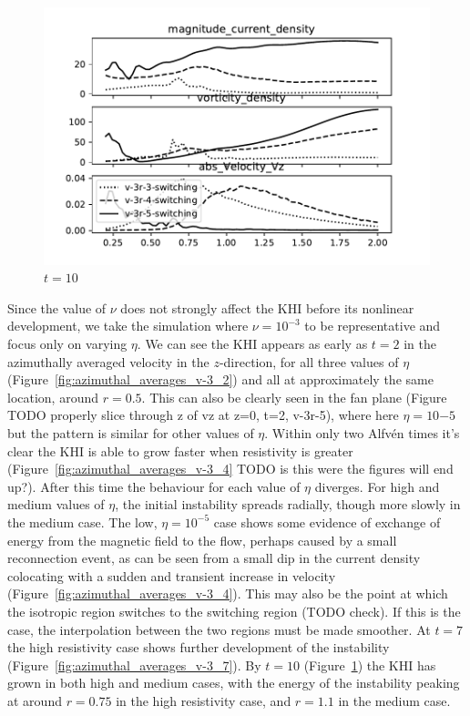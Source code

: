 \begin{figure}[h]
  \centering
  \includegraphics[width=0.8\linewidth]{./images/null_point_khi/azimuthal_averages_v-3_10.pdf}
  \caption{$t=10$}%
  \label{fig:azimuthal_averages_v-3_10}
\end{figure}

Since the value of $\nu$ does not strongly affect the KHI before its nonlinear development, we take the simulation where $\nu = 10^{-3}$ to be representative and focus only on varying $\eta$. We can see the KHI appears as early as $t=2$ in the azimuthally averaged velocity in the $z$-direction, for all three values of $\eta$ (Figure~\ref{fig:azimuthal_averages_v-3_2}) and all at approximately the same location, around $r=0.5$. This can also be clearly seen in the fan plane (Figure TODO properly slice through z of vz at z=0, t=2, v-3r-5), where here $\eta=10{-5}$ but the pattern is similar for other values of $\eta$. Within only two Alfv\'en times it's clear the KHI is able to grow faster when resistivity is greater (Figure~\ref{fig:azimuthal_averages_v-3_4} TODO is this were the figures will end up?). After this time the behaviour for each value of $\eta$ diverges. For high and medium values of $\eta$, the initial instability spreads radially, though more slowly in the medium case. The low, $\eta=10^{-5}$ case shows some evidence of exchange of energy from the magnetic field to the flow, perhaps caused by a small reconnection event, as can be seen from a small dip in the current density colocating with a sudden and transient increase in velocity (Figure~\ref{fig:azimuthal_averages_v-3_4}). This may also be the point at which the isotropic region switches to the switching region (TODO check). If this is the case, the interpolation between the two regions must be made smoother. At $t=7$ the high resistivity case shows further development of the instability (Figure~\ref{fig:azimuthal_averages_v-3_7}). By $t=10$ (Figure~\ref{fig:azimuthal_averages_v-3_10}) the KHI has grown in both high and medium cases, with the energy of the instability peaking at around $r=0.75$ in the high resistivity case, and $r=1.1$ in the medium case.

